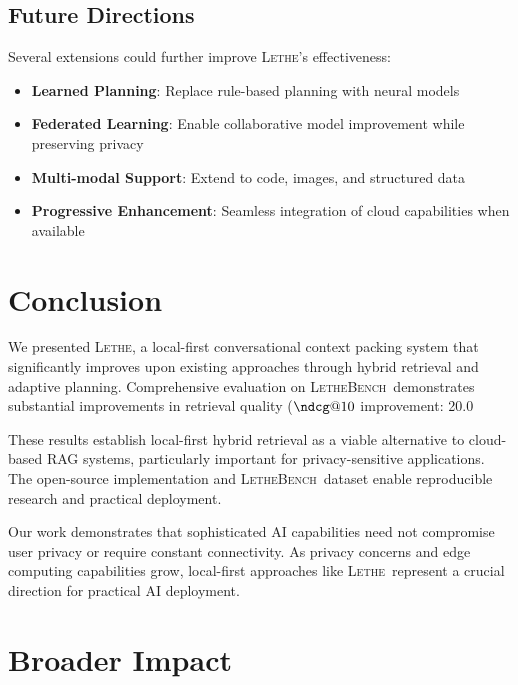 \documentclass[letterpaper]{article}
\newcommand{\lethe}{\textsc{Lethe}}
\newcommand{\lethebench}{\textsc{LetheBench}}
\begin{document}
\subsection{Future Directions}

Several extensions could further improve \lethe's effectiveness:

\begin{itemize}
    \item \textbf{Learned Planning}: Replace rule-based planning with neural models
    \item \textbf{Federated Learning}: Enable collaborative model improvement while preserving privacy
    \item \textbf{Multi-modal Support}: Extend to code, images, and structured data
    \item \textbf{Progressive Enhancement}: Seamless integration of cloud capabilities when available
\end{itemize}

\section{Conclusion}

We presented \lethe, a local-first conversational context packing system that significantly improves upon existing approaches through hybrid retrieval and adaptive planning. Comprehensive evaluation on \lethebench\ demonstrates substantial improvements in retrieval quality ($\ndcg@10$ improvement: 20.0%

These results establish local-first hybrid retrieval as a viable alternative to cloud-based RAG systems, particularly important for privacy-sensitive applications. The open-source implementation and \lethebench\ dataset enable reproducible research and practical deployment.

Our work demonstrates that sophisticated AI capabilities need not compromise user privacy or require constant connectivity. As privacy concerns and edge computing capabilities grow, local-first approaches like \lethe\ represent a crucial direction for practical AI deployment.

\section*{Broader Impact}
\end{document}
